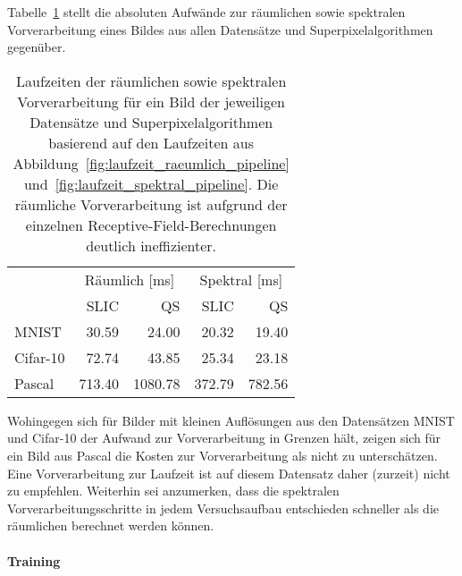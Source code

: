 Tabelle~\ref{tab:laufzeit_raeumlich_spektral} stellt die absoluten Aufwände zur räumlichen sowie spektralen Vorverarbeitung eines Bildes aus allen Datensätze und Superpixelalgorithmen gegenüber.
\begin{table}[t]
\centering
\begin{tabular}{lrrrr}
  \toprule
  & \multicolumn{2}{c}{Räumlich [ms]} & \multicolumn{2}{c}{Spektral [ms]}\\
  \cmidrule{2-5}
  & \acs{SLIC} & \acs{QS} & \acs{SLIC} & \acs{QS}\\
  \midrule
  \acs{MNIST} & 30.59 & 24.00 & 20.32 & 19.40\\
  \acs{Cifar}-10 & 72.74 & 43.85 & 25.34 & 23.18\\
  \acs{Pascal} & 713.40 & 1080.78 & 372.79 & 782.56\\
  \bottomrule
\end{tabular}
\caption[Laufzeiten der räumlichen und spektralen Vorverarbeitung]{Laufzeiten der räumlichen sowie spektralen Vorverarbeitung für ein Bild der jeweiligen Datensätze und Superpixelalgorithmen basierend auf den Laufzeiten aus Abbildung~\ref{fig:laufzeit_raeumlich_pipeline} und~\ref{fig:laufzeit_spektral_pipeline}.
Die räumliche Vorverarbeitung ist aufgrund der einzelnen Receptive-Field-Berechnungen deutlich ineffizienter.}
\label{tab:laufzeit_raeumlich_spektral}
\end{table}
Wohingegen sich für Bilder mit kleinen Auflösungen aus den Datensätzen \gls{MNIST} und \gls{Cifar}-10 der Aufwand zur Vorverarbeitung in Grenzen hält, zeigen sich für ein Bild aus \gls{Pascal} die Kosten zur Vorverarbeitung als nicht zu unterschätzen.
Eine Vorverarbeitung zur Laufzeit ist auf diesem Datensatz daher (zurzeit) nicht zu empfehlen.
Weiterhin sei anzumerken, dass die spektralen Vorverarbeitungsschritte in jedem Versuchsaufbau entschieden schneller als die räumlichen berechnet werden können.

\paragraph{Training}

